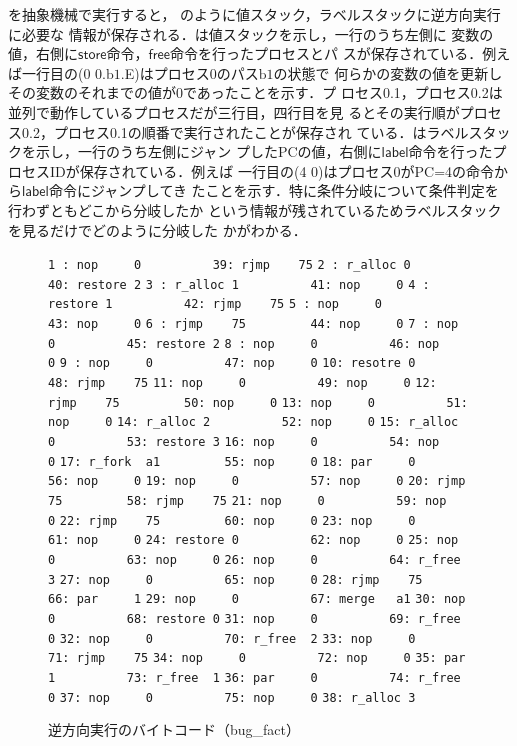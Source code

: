\documentclass[submit,PRO]{ipsj}
\newcommand{\bcode}[1]{$\mathsf{#1}$}
\newcommand{\blabel}[1]{\mathrm{b}#1}
\def\|{\verb|}
\begin{document}
を抽象機械で実行すると，
のように値スタック，ラベルスタックに逆方向実行に必要な
情報が保存される．は値スタックを示し，一行のうち左側に
変数の値，右側に\bcode{store}命令，\bcode{free}命令を行ったプロセスとパ
スが保存されている．例えば一行目の(0 0.$\blabel{1}$.E)はプロセス0のパス$\blabel{1}$の状態で
何らかの変数の値を更新しその変数のそれまでの値が0であったことを示す．プ
ロセス0.1，プロセス0.2は並列で動作しているプロセスだが三行目，四行目を見
るとその実行順がプロセス0.2，プロセス0.1の順番で実行されたことが保存され
ている．はラベルスタックを示し，一行のうち左側にジャン
プしたPCの値，右側に\bcode{label}命令を行ったプロセスIDが保存されている．例えば
一行目の(4 0)はプロセス0がPC=4の命令から\bcode{label}命令にジャンプしてき
たことを示す．特に条件分岐について条件判定を行わずともどこから分岐したか
という情報が残されているためラベルスタックを見るだけでどのように分岐した
かがわかる．

\begin{figure}[tb]
\vbox{
\hbox{\|1 : nop     0          39: rjmp    75|}
\hbox{\|2 : r_alloc 0          40: restore 2|}
\hbox{\|3 : r_alloc 1          41: nop     0|}
\hbox{\|4 : restore 1          42: rjmp    75|}
\hbox{\|5 : nop     0          43: nop     0|}
\hbox{\|6 : rjmp    75         44: nop     0|}
\hbox{\|7 : nop     0          45: restore 2|}
\hbox{\|8 : nop     0          46: nop     0|}
\hbox{\|9 : nop     0          47: nop     0|}
\hbox{\|10: resotre 0          48: rjmp    75|}
\hbox{\|11: nop     0          49: nop     0|}
\hbox{\|12: rjmp    75         50: nop     0|}
\hbox{\|13: nop     0          51: nop     0|}
\hbox{\|14: r_alloc 2          52: nop     0|}
\hbox{\|15: r_alloc 0          53: restore 3|}
\hbox{\|16: nop     0          54: nop     0|}
\hbox{\|17: r_fork  a1         55: nop     0|}
\hbox{\|18: par     0          56: nop     0|}
\hbox{\|19: nop     0          57: nop     0|}
\hbox{\|20: rjmp    75         58: rjmp    75|}
\hbox{\|21: nop     0          59: nop     0|}
\hbox{\|22: rjmp    75         60: nop     0|}
\hbox{\|23: nop     0          61: nop     0|}
\hbox{\|24: restore 0          62: nop     0|}
\hbox{\|25: nop     0          63: nop     0|}
\hbox{\|26: nop     0          64: r_free  3|}
\hbox{\|27: nop     0          65: nop     0|}
\hbox{\|28: rjmp    75         66: par     1|}
\hbox{\|29: nop     0          67: merge   a1|}
\hbox{\|30: nop     0          68: restore 0|}
\hbox{\|31: nop     0          69: r_free  0|}
\hbox{\|32: nop     0          70: r_free  2|}
\hbox{\|33: nop     0          71: rjmp    75|}
\hbox{\|34: nop     0          72: nop     0|}
\hbox{\|35: par     1          73: r_free  1|}
\hbox{\|36: par     0          74: r_free  0|}
\hbox{\|37: nop     0          75: nop     0|}
\hbox{\|38: r_alloc 3         |}
}
\centerline{}
\caption{逆方向実行のバイトコード（bug\_fact）}
\label{fig:backwardfact}
\end{figure}
\end{document}
